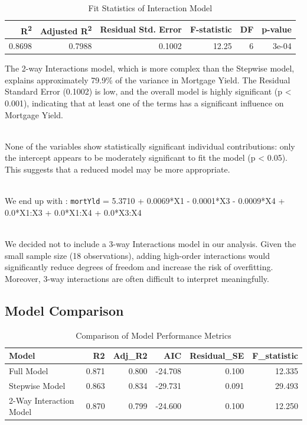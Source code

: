 \documentclass[
  11pt,
]{article}
\begin{document}
\begin{table}[!h]
\centering
\caption{\label{tab:unnamed-chunk-16}Fit Statistics of Interaction Model}
\centering
\fontsize{8}{10}\selectfont
\begin{tabular}[t]{rrrrrr}
\toprule
R\textsuperscript{2} & Adjusted R\textsuperscript{2} & Residual Std. Error & F-statistic & DF & p-value\\
\midrule
0.8698 & 0.7988 & 0.1002 & 12.25 & 6 & 3e-04\\
\bottomrule
\end{tabular}
\end{table}

The 2-way Interactions model, which is more complex than the Stepwise
model, explains approximately 79.9\% of the variance in Mortgage Yield.
The Residual Standard Error (0.1002) is low, and the overall model is
highly significant (p \textless{} 0.001), indicating that at least one
of the terms has a significant influence on Mortgage Yield.\\
\strut \\
None of the variables show statistically significant individual
contributions: only the intercept appears to be moderately significant
to fit the model (p \textless{} 0.05). This suggests that a reduced
model may be more appropriate.\\
\strut \\
We end up with : \texttt{mortYld} = 5.3710 + 0.0069*X1 - 0.0001*X3 -
0.0009*X4 + 0.0*X1:X3 + 0.0*X1:X4 + 0.0*X3:X4\\
\strut \\
We decided not to include a 3-way Interactions model in our analysis.
Given the small sample size (18 observations), adding high-order
interactions would significantly reduce degrees of freedom and increase
the risk of overfitting. Moreover, 3-way interactions are often
difficult to interpret meaningfully.

\subsection{Model Comparison}\label{model-comparison}

\begingroup\fontsize{8}{10}\selectfont

\begin{longtable}[t]{lrrrrr}
\caption{\label{tab:unnamed-chunk-17}Comparison of Model Performance Metrics}\\
\toprule
Model & R2 & Adj\_R2 & AIC & Residual\_SE & F\_statistic\\
\midrule
Full Model & 0.871 & 0.800 & -24.708 & 0.100 & 12.335\\
Stepwise Model & 0.863 & 0.834 & -29.731 & 0.091 & 29.493\\
2-Way Interaction Model & 0.870 & 0.799 & -24.600 & 0.100 & 12.250\\
\bottomrule
\end{longtable}
\endgroup{}
\end{document}
